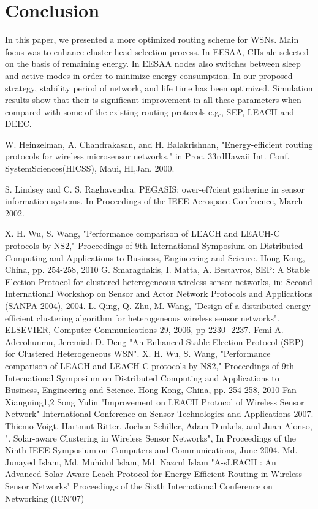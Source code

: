 \documentclass[journal]{IEEEtran}
\begin{document}
\section{Conclusion}
In this paper, we presented a more optimized routing scheme for WSNs. Main focus was to enhance cluster-head selection process. In EESAA, CHs ale selected on the basis of remaining energy. In EESAA nodes also switches between sleep and active modes in order to minimize energy consumption. In our proposed strategy, stability period of network, and life time has been optimized. Simulation results show that their is significant improvement in all these parameters when compared with some of the existing routing protocols e.g., SEP, LEACH and DEEC.



\begin{thebibliography}{1}


W. Heinzelman, A. Chandrakasan, and H. Balakrishnan, "Energy-efficient
routing protocols for wireless microsensor networks," in Proc.
33rdHawaii Int. Conf. SystemSciences(HICSS), Maui, HI,Jan. 2000.


S. Lindsey and C. S. Raghavendra. PEGASIS: ower-ef?cient gathering in sensor information systems. In Proceedings of the IEEE Aerospace Conference, March 2002.


X. H. Wu, S. Wang, "Performance comparison of LEACH and LEACH-C protocols by NS2," Proceedings of 9th International Symposium on Distributed Computing and Applications to Business, Engineering and Science. Hong Kong, China, pp. 254-258, 2010
G. Smaragdakis, I. Matta, A. Bestavros, SEP: A Stable Election
Protocol for clustered heterogeneous wireless sensor networks, in:
Second International Workshop on Sensor and Actor Network
Protocols and Applications (SANPA 2004), 2004.
L. Qing, Q. Zhu, M. Wang, "Design of a distributed
energy-efficient clustering algorithm for heterogeneous
wireless sensor networks". ELSEVIER, Computer
Communications 29, 2006, pp 2230- 2237.
Femi A. Aderohunmu, Jeremiah D. Deng "An Enhanced Stable Election Protocol (SEP) for Clustered Heterogeneous WSN".
X. H. Wu, S. Wang, "Performance comparison of LEACH and LEACH-C protocols by NS2," Proceedings of 9th International Symposium on Distributed Computing and Applications to Business, Engineering and Science. Hong Kong, China, pp. 254-258, 2010
Fan Xiangning1,2 Song Yulin "Improvement on LEACH Protocol of Wireless Sensor Network"
International  Conference on Sensor Technologies and Applications 2007.
Thiemo Voigt, Hartmut Ritter, Jochen Schiller, Adam Dunkels, and Juan Alonso, ". Solar-aware
Clustering in Wireless Sensor Networks", In Proceedings
of the Ninth IEEE Symposium on Computers and Communications, June 2004.
 Md. Junayed Islam, Md. Muhidul Islam, Md. Nazrul Islam "A-sLEACH : An Advanced Solar Aware Leach Protocol for Energy Efficient Routing in Wireless Sensor Networks" Proceedings of the Sixth International Conference on Networking (ICN'07)


\end{thebibliography}
\end{document}
